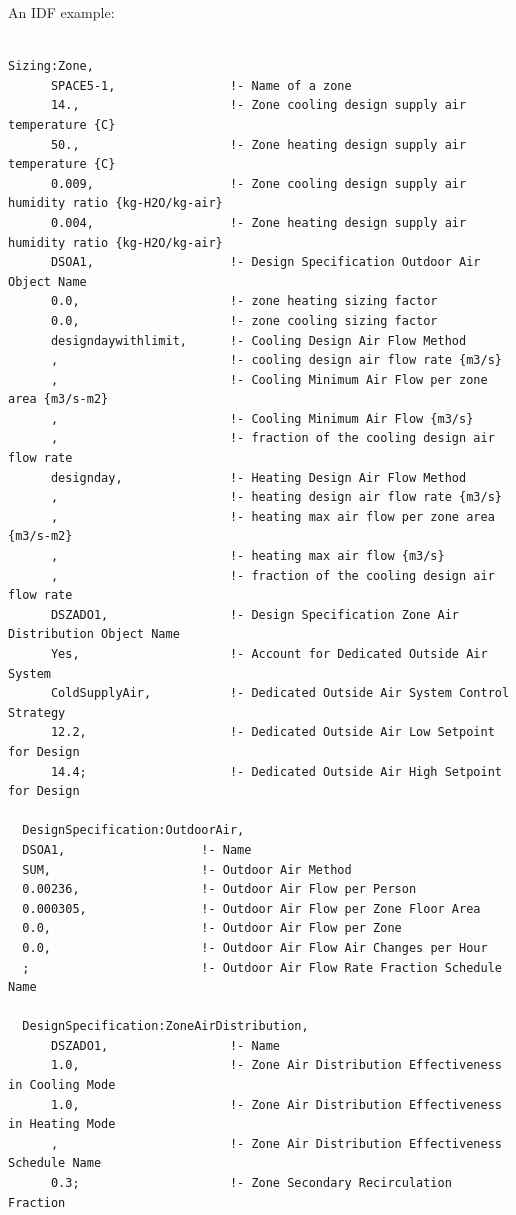 An IDF example:

\begin{lstlisting}

Sizing:Zone,
      SPACE5-1,                !- Name of a zone
      14.,                     !- Zone cooling design supply air temperature {C}
      50.,                     !- Zone heating design supply air temperature {C}
      0.009,                   !- Zone cooling design supply air humidity ratio {kg-H2O/kg-air}
      0.004,                   !- Zone heating design supply air humidity ratio {kg-H2O/kg-air}
      DSOA1,                   !- Design Specification Outdoor Air Object Name
      0.0,                     !- zone heating sizing factor
      0.0,                     !- zone cooling sizing factor
      designdaywithlimit,      !- Cooling Design Air Flow Method
      ,                        !- cooling design air flow rate {m3/s}
      ,                        !- Cooling Minimum Air Flow per zone area {m3/s-m2}
      ,                        !- Cooling Minimum Air Flow {m3/s}
      ,                        !- fraction of the cooling design air flow rate
      designday,               !- Heating Design Air Flow Method
      ,                        !- heating design air flow rate {m3/s}
      ,                        !- heating max air flow per zone area {m3/s-m2}
      ,                        !- heating max air flow {m3/s}
      ,                        !- fraction of the cooling design air flow rate
      DSZADO1,                 !- Design Specification Zone Air Distribution Object Name
      Yes,                     !- Account for Dedicated Outside Air System
      ColdSupplyAir,           !- Dedicated Outside Air System Control Strategy
      12.2,                    !- Dedicated Outside Air Low Setpoint for Design
      14.4;                    !- Dedicated Outside Air High Setpoint for Design

  DesignSpecification:OutdoorAir,
  DSOA1,                   !- Name
  SUM,                     !- Outdoor Air Method
  0.00236,                 !- Outdoor Air Flow per Person
  0.000305,                !- Outdoor Air Flow per Zone Floor Area
  0.0,                     !- Outdoor Air Flow per Zone
  0.0,                     !- Outdoor Air Flow Air Changes per Hour
  ;                        !- Outdoor Air Flow Rate Fraction Schedule Name

  DesignSpecification:ZoneAirDistribution,
      DSZADO1,                 !- Name
      1.0,                     !- Zone Air Distribution Effectiveness in Cooling Mode
      1.0,                     !- Zone Air Distribution Effectiveness in Heating Mode
      ,                        !- Zone Air Distribution Effectiveness Schedule Name
      0.3;                     !- Zone Secondary Recirculation Fraction
\end{lstlisting}

